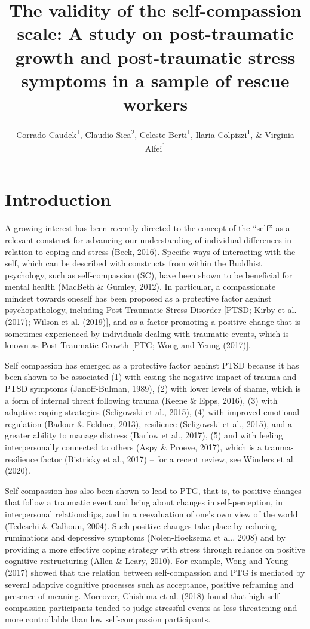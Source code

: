 \documentclass[
  english,
  man,floatsintext]{apa7}
\title{The validity of the self-compassion scale: A study on post-traumatic growth and post-traumatic stress symptoms in a sample of rescue workers}
\author{Corrado Caudek\textsuperscript{1}, Claudio Sica\textsuperscript{2}, Celeste Berti\textsuperscript{1}, Ilaria Colpizzi\textsuperscript{1}, \& Virginia Alfei\textsuperscript{1}}
\date{}
\affiliation{\vspace{0.5cm}\textsuperscript{1} NEUROFARBA Department, Psychology Section, University of Florence, Italy\\\textsuperscript{2} Health Sciences Department, Psychology Section, University of Florence, Italy}
\begin{document}
\maketitle

\hypertarget{introduction}{%
\section{Introduction}\label{introduction}}

A growing interest has been recently directed to the concept of the ``self'' as a relevant construct for advancing our understanding of individual differences in relation to coping and stress (Beck, 2016). Specific ways of interacting with the self, which can be described with constructs from within the Buddhist psychology, such as self-compassion (SC), have been shown to be beneficial for mental health (MacBeth \& Gumley, 2012). In particular, a compassionate mindset towards oneself has been proposed as a protective factor against psychopathology, including Post-Traumatic Stress Disorder {[}PTSD; Kirby et al. (2017); Wilson et al. (2019){]}, and as a factor promoting a positive change that is sometimes experienced by individuals dealing with traumatic events, which is known as Post-Traumatic Growth {[}PTG; Wong and Yeung (2017){]}.

Self compassion has emerged as a protective factor against PTSD because it has been shown to be associated (1) with easing the negative impact of trauma and PTSD symptoms (Janoff-Bulman, 1989), (2) with lower levels of shame, which is a form of internal threat following trauma (Keene \& Epps, 2016), (3) with adaptive coping strategies (Seligowski et al., 2015), (4) with improved emotional regulation (Badour \& Feldner, 2013), resilience (Seligowski et al., 2015), and a greater ability to manage distress (Barlow et al., 2017), (5) and with feeling interpersonally connected to others (Aspy \& Proeve, 2017), which is a trauma-resilience factor (Bistricky et al., 2017) -- for a recent review, see Winders et al. (2020).

Self compassion has also been shown to lead to PTG, that is, to positive changes that follow a traumatic event and bring about changes in self-perception, in interpersonal relationships, and in a reevaluation of one's own view of the world (Tedeschi \& Calhoun, 2004). Such positive changes take place by reducing ruminations and depressive symptoms (Nolen-Hoeksema et al., 2008) and by providing a more effective coping strategy with stress through reliance on positive cognitive restructuring (Allen \& Leary, 2010). For example, Wong and Yeung (2017) showed that the relation between self-compassion and PTG is mediated by several adaptive cognitive processes such as acceptance, positive reframing and presence of meaning. Moreover, Chishima et al. (2018) found that high self-compassion participants tended to judge stressful events as less threatening and more controllable than low self-compassion participants.
\end{document}
